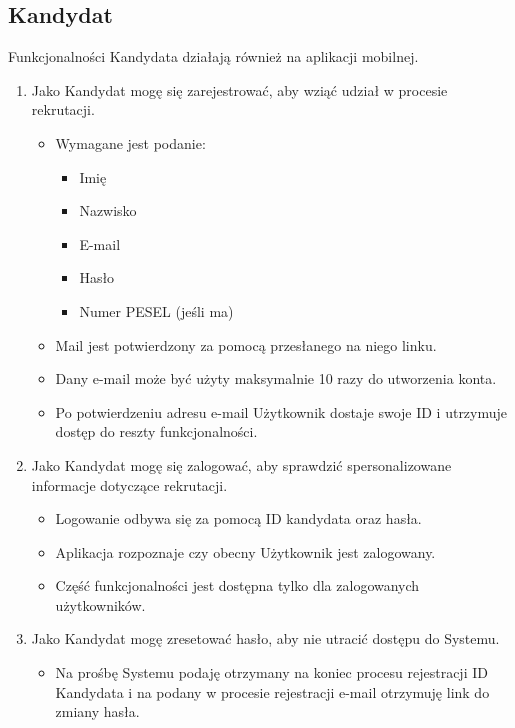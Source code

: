 \documentclass{article}
\begin{document}
\subsection{Kandydat}
Funkcjonalności Kandydata działają również na aplikacji mobilnej.
\begin{enumerate}
    \item Jako Kandydat mogę się zarejestrować, aby wziąć udział w procesie rekrutacji.
        \begin{itemize}
            \item Wymagane jest podanie: 
                \begin{itemize}
                    \item Imię
                    \item Nazwisko
                    \item E-mail
                    \item Hasło
                    \item Numer PESEL (jeśli ma)
                \end{itemize}
            \item Mail jest potwierdzony za pomocą przesłanego na niego linku.
            \item Dany e-mail może być użyty maksymalnie 10 razy do utworzenia konta.
            \item Po potwierdzeniu adresu e-mail Użytkownik dostaje swoje ID i utrzymuje dostęp do reszty funkcjonalności.
        \end{itemize}
    \item Jako Kandydat mogę się zalogować, aby sprawdzić spersonalizowane informacje dotyczące rekrutacji.
        \begin{itemize}
            \item Logowanie odbywa się za pomocą ID kandydata oraz hasła.
            \item Aplikacja rozpoznaje czy obecny Użytkownik jest zalogowany.
            \item Część funkcjonalności jest dostępna tylko dla zalogowanych użytkowników.
        \end{itemize}
    \item Jako Kandydat mogę zresetować hasło, aby nie utracić dostępu do Systemu.    
        \begin{itemize}
            \item Na prośbę Systemu podaję otrzymany na koniec procesu rejestracji ID Kandydata i na podany w procesie rejestracji e-mail otrzymuję link do zmiany hasła.

\end{itemize}
\end{enumerate}
\end{document}
